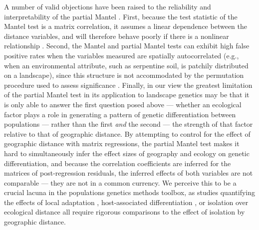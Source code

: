 A number of valid objections have been raised to the reliability and interpretability of the 
partial Mantel \citep[e.g.][]{LegendreFortin2010,Guillot2013}. 
First, because the test statistic of the Mantel test is a matrix correlation, it assumes a linear dependence between the distance variables, and will therefore behave poorly if there is a nonlinear relationship \citep{LegendreFortin2010}.  Second, the Mantel and partial Mantel tests can exhibit high false positive rates when the variables measured are spatially autocorrelated (e.g., when an environmental attribute, such as serpentine soil, is patchily distributed on a landscape), since this structure is not accommodated by the permutation procedure used to assess significance \citep{Guillot2013}. Finally, in our view the greatest limitation of the partial Mantel test in its application to landscape genetics may be that it is only able to answer the first question posed above --- whether an ecological factor plays a role in generating a pattern of genetic differentiation between populations --- rather than the first \emph{and} the second --- the strength of that factor relative to that of geographic distance.  By attempting to control for the effect of geographic distance with matrix regressions, the partial Mantel test makes it hard to simultaneously infer the effect sizes of geography and ecology on genetic differentiation, and because the correlation coefficients are inferred for the matrices of post-regression residuals, the inferred effects of both variables are not comparable --- they are not in a common currency.  
We perceive this to be a crucial lacuna in the populations genetics methods toolbox, as studies quantifying the effects of local adaptation \citep[e.g.][]{RosenblumHarmon2011}, host-associated differentiation \citep[e.g.][]{DresMallet2002, Gomez-Diaz2010}, or isolation over ecological distance \citep[e.g.][]{Andrew2012, Mosca2012} all require rigorous comparisons to the effect of isolation by geographic distance.  

